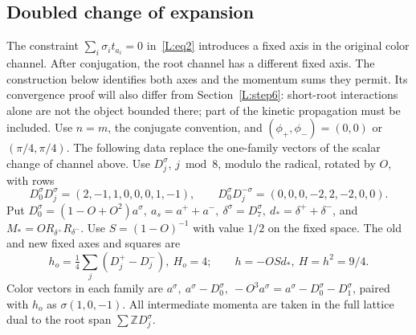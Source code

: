 \subsection{Doubled change of expansion}\label{L:step10}

The constraint $\sum_i\sigma_i t_{a_i}=0$ in~\eqref{L:eq2}
introduces a fixed axis in the original color channel. After conjugation,
the root channel has a different fixed axis. The construction below
identifies both axes and the momentum sums they permit. Its convergence
proof will also differ from Section~\ref{L:step6}: short-root interactions
alone are not the object bounded there; part of the kinetic propagation
must be included. Use \(n=m\), the conjugate convention, and \((\phi_+,\phi_-)=(0,0)\) or \((\pi/4,\pi/4)\). The following data replace the one-family vectors of the scalar change of channel above. Use \(D_j^\sigma\), \(j\bmod8\), modulo the radical, rotated by \(O\), with rows
\[
 D_0^\sigma D_j^\sigma=(2,-1,1,0,0,0,1,-1),\qquad
 D_0^\sigma D_j^{-\sigma}=(0,0,0,-2,2,-2,0,0).
\]
Put \(D_0^\sigma=(1-O+O^2)a^\sigma,\ a_s=a^++a^-,\ \delta^\sigma=D_7^\sigma,\ d_*=\delta^++\delta^-\), and \(M_*=O R_{\delta^+}R_{\delta^-}\). Use \(S=(1-O)^{-1}\) with value \(1/2\) on the fixed space. The old and new fixed axes and squares are
\[
 h_o=\tfrac14\sum_j(D_j^+-D_j^-),\ H_o=4;\qquad h=-OS d_*,\ H=h^2=9/4.
\]
Color vectors in each family are \(a^\sigma,\ a^\sigma-D_0^\sigma,\ -O^3 a^\sigma=a^\sigma-D_0^\sigma-D_1^\sigma\), paired with \(h_o\) as \(\sigma(1,0,-1)\). All intermediate momenta are taken in the full lattice dual to the root span \(\sum\mathbb ZD_j^\sigma\).

